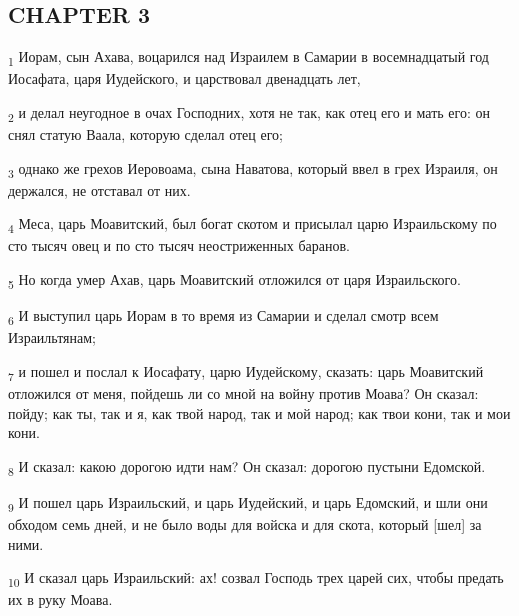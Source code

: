 \subsection{CHAPTER 3}
\begin{tcolorbox}
\textsubscript{1} Иорам, сын Ахава, воцарился над Израилем в Самарии в восемнадцатый год Иосафата, царя Иудейского, и царствовал двенадцать лет,
\end{tcolorbox}
\begin{tcolorbox}
\textsubscript{2} и делал неугодное в очах Господних, хотя не так, как отец его и мать его: он снял статую Ваала, которую сделал отец его;
\end{tcolorbox}
\begin{tcolorbox}
\textsubscript{3} однако же грехов Иеровоама, сына Наватова, который ввел в грех Израиля, он держался, не отставал от них.
\end{tcolorbox}
\begin{tcolorbox}
\textsubscript{4} Меса, царь Моавитский, был богат скотом и присылал царю Израильскому по сто тысяч овец и по сто тысяч неостриженных баранов.
\end{tcolorbox}
\begin{tcolorbox}
\textsubscript{5} Но когда умер Ахав, царь Моавитский отложился от царя Израильского.
\end{tcolorbox}
\begin{tcolorbox}
\textsubscript{6} И выступил царь Иорам в то время из Самарии и сделал смотр всем Израильтянам;
\end{tcolorbox}
\begin{tcolorbox}
\textsubscript{7} и пошел и послал к Иосафату, царю Иудейскому, сказать: царь Моавитский отложился от меня, пойдешь ли со мной на войну против Моава? Он сказал: пойду; как ты, так и я, как твой народ, так и мой народ; как твои кони, так и мои кони.
\end{tcolorbox}
\begin{tcolorbox}
\textsubscript{8} И сказал: какою дорогою идти нам? Он сказал: дорогою пустыни Едомской.
\end{tcolorbox}
\begin{tcolorbox}
\textsubscript{9} И пошел царь Израильский, и царь Иудейский, и царь Едомский, и шли они обходом семь дней, и не было воды для войска и для скота, который [шел] за ними.
\end{tcolorbox}
\begin{tcolorbox}
\textsubscript{10} И сказал царь Израильский: ах! созвал Господь трех царей сих, чтобы предать их в руку Моава.
\end{tcolorbox}

